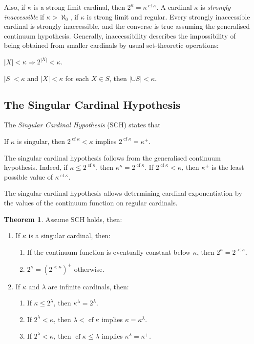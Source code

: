 \documentclass[8pt]{article}
\theoremstyle{definition}
\theoremstyle{definition}
\newtheorem{theorem}{Theorem}[section]
\theoremstyle{definition}
\theoremstyle{definition}
\theoremstyle{definition}
\theoremstyle{definition}
\theoremstyle{definition}
\theoremstyle{definition}
\theoremstyle{definition}
\theoremstyle{definition}
\theoremstyle{definition}
\theoremstyle{definition}
\theoremstyle{definition}
\theoremstyle{definition}
\theoremstyle{question}
\begin{document}
Also, if $\kappa$ is a strong limit cardinal, then $2^{\kappa} = \kappa^{\operatorname{cf} \kappa}$.
A cardinal $\kappa$ is \emph{strongly inaccessible} if $\kappa > \aleph_0$, if $\kappa$ is strong limit and regular.
Every strongly inaccessible cardinal is strongly inaccessible, and the converse is true assuming the generalised continuum hypothesis.
Generally, inaccessibility describes the impossibility of being obtained from smaller cardinals by usual set-theoretic operations:
\begin{center}
  $|X| < \kappa \Rightarrow 2^{|X|} < \kappa$.

  $|S| < \kappa$ and $|X| < \kappa$ for each $X \in S$, then $|\cup S| < \kappa$.
\end{center}

\subsection{The Singular Cardinal Hypothesis}

The \emph{Singular Cardinal Hypothesis} (SCH) states that
\begin{center}
  If $\kappa$ is singular, then $2^{\operatorname{cf} \kappa} < \kappa$ implies $2^{\operatorname{cf} \kappa} = \kappa^{+}$.
\end{center}
The singular cardinal hypothesis follows from the generalised continuum hypothesis. 
Indeed, if $\kappa \leq 2^{\operatorname{cf} \kappa}$, then $\kappa^{\kappa} = 2^{\operatorname{cf} \kappa}$.
If $2^{\operatorname{cf} \kappa} < \kappa$, then $\kappa^{+}$ is the least possible value of $\kappa^{\operatorname{cf} \kappa}$.

The singular cardinal hypothesis allows determining cardinal exponentiation by the values of
the continuum function on regular cardinals.

\begin{theorem}
  Assume SCH holds, then:

  \begin{enumerate}
    \item If $\kappa$ is a singular cardinal, then:
    \begin{enumerate}
      \item If the continuum function is eventually constant below $\kappa$, then $2^{\kappa} = 2^{< \kappa}$.
      \item $2^{\kappa} = (2^{< \kappa})^+$ otherwise.
    \end{enumerate}
    \item If $\kappa$ and $\lambda$ are infinite cardinals, then:
    \begin{enumerate}
      \item If $\kappa \leq 2^{\lambda}$, then $\kappa^{\lambda} = 2^{\lambda}$.
      \item If $2^{\lambda} < \kappa$, then $\lambda < \operatorname{cf} \kappa$ implies $\kappa = \kappa^{\lambda}$.
      \item If $2^{\lambda} < \kappa$, then $\operatorname{cf} \kappa \leq \lambda$ implies $ \kappa^{\lambda} = \kappa^+$.
    \end{enumerate}
  \end{enumerate}
\end{theorem}
\end{document}
